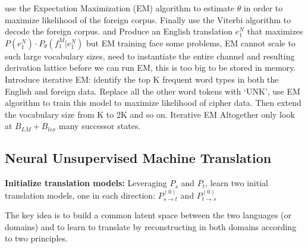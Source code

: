 use the Expectation Maximization (EM) algorithm to estimate $\theta$ in order to maximize likelihood of the foreign corpus. Finally use the Viterbi algorithm to decode the foreign corpus. and Produce an English translation $e_1^N$ that maximizes ${P(e_1^N)\cdot P_{\theta}(f_1^M | e_1^N)}$ but EM training face some problems, EM cannot scale to such large vocabulary sizes, need to instantiate the entire channel and resulting derivation lattice before we can run EM, this is too big to be stored in memory. Introduce iterative EM: identify the top K frequent word types in both the English and foreign data. Replace all the other word tokens with ‘UNK’, use EM algorithm to train this model to maximize likelihood of cipher data. Then extend the vocabulary size from K to 2K and so on.
Iterative EM
\cite{nuhn2012deciphering}
Altogether only look at ${B_{LM}+B_{lex}}$ many successor states.
\cite{nuhn2014decipherment}


\cite{gehring2017convolutional}
\subsection{Neural Unsupervised Machine Translation}

\begin{algorithm}[H]
	\SetAlgoLined
	\textbf{Initialize translation models:}  Leveraging ${P_s}$ and ${P_t}$, learn two initial translation models, one in each direction: ${P_{s\rightarrow t}^{(0)}}$ and ${P_{t\rightarrow s}^{(0)}}$ 
	\BlankLine
\end{algorithm}
The key idea is to build a common latent space between the two languages (or domains) and to learn to translate by reconstructing in both domains according to two principles. 



